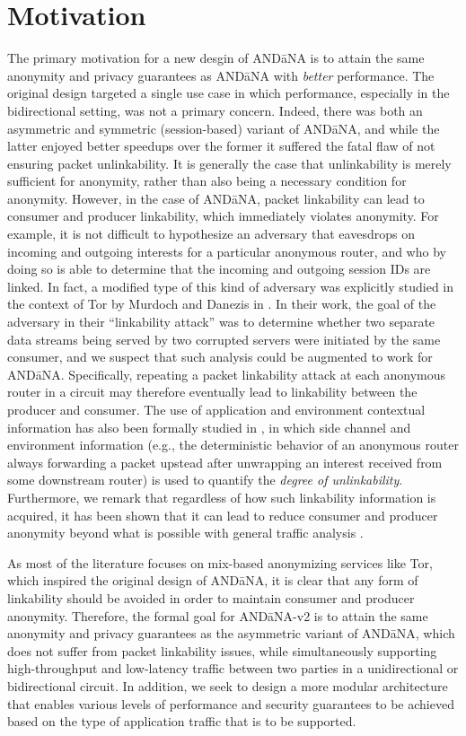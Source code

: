 \documentclass[10pt]{article}
\begin{document}
\section{Motivation}
The primary motivation for a new desgin of {\sf AND\=aNA} is to attain the same anonymity and privacy guarantees as {\sf AND\=aNA} with \emph{better} performance. The original design targeted a single use case in which performance, especially in the bidirectional setting, was not a primary concern. Indeed, there was both an asymmetric and symmetric (session-based) variant of {\sf AND\=aNA}, and while the latter enjoyed better speedups over the former it suffered the fatal flaw of not ensuring packet unlinkability. It is generally the case that unlinkability is merely sufficient for anonymity, rather than also being a necessary condition for anonymity. However, in the case of {\sf AND\=aNA}, packet linkability can lead to consumer and producer linkability, which immediately violates anonymity. For example, it is not difficult to hypothesize an adversary that eavesdrops on incoming and outgoing interests for a particular anonymous router, and who by doing so is able to determine that the incoming and outgoing session IDs are linked. In fact, a modified type of this kind of adversary was explicitly studied in the context of Tor by Murdoch and Danezis in \cite{tor-traffic-analysis}. In their work, the goal of the adversary in their ``linkability attack'' was to determine whether two separate data streams being served by two corrupted servers were initiated by the same consumer, and we suspect that such analysis could be augmented to work for {\sf AND\=aNA}. Specifically, repeating a packet linkability attack at each anonymous router in a circuit may therefore eventually lead to linkability between the producer and consumer. The use of application and environment contextual information has also been formally studied in \cite{attacking-unlinkability}, in which side channel and environment information (e.g., the deterministic behavior of an anonymous router always forwarding a packet upstead after unwrapping an interest received from some downstream router) is used to quantify the \emph{degree of unlinkability}. Furthermore, we remark that regardless of how such linkability information is acquired, it has been shown that it can lead to reduce consumer and producer anonymity beyond what is possible with general traffic analysis \cite{linkability-attacks}. 

As most of the literature focuses on mix-based anonymizing services like Tor, which inspired the original design of {\sf AND\=aNA}, it is clear that any form of linkability should be avoided in order to maintain consumer and producer anonymity. Therefore, the formal goal for {\sf AND\=aNA-v2} is to attain the same anonymity and privacy guarantees as the asymmetric variant of {\sf AND\=aNA}, which does not suffer from packet linkability issues, while simultaneously supporting high-throughput and low-latency traffic between two parties in a unidirectional or bidirectional circuit. In addition, we seek to design a more modular architecture that enables various levels of performance and security guarantees to be achieved based on the type of application traffic that is to be supported. 
\end{document}
